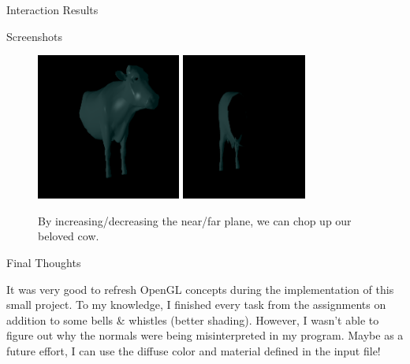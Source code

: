 \documentclass{article}
\begin{document}
\begin{section}{Interaction Results}
\begin{multicols}{2}
\begin{subsection}{Screenshots}
    \begin{figure}[H]
     \includegraphics[width=0.48\linewidth, height=13em]{./res/farclip.png}
     \includegraphics[width=0.48\linewidth, height=13em]{./res/nearclip.png}
     \caption{By increasing/decreasing the near/far plane, we can chop up our
beloved cow.}
    \end{figure}

  \end{subsection}

  \end{multicols}
  \end{section}
  \begin{multicols}{2}
  \begin{section}{Final Thoughts}

    It was very good to refresh OpenGL concepts during the implementation of
this small project. To my knowledge, I finished every task from the assignments
on addition to some bells \& whistles (better shading). However, I wasn't able to
figure out why the normals were being misinterpreted in my program. Maybe as a
future effort, I can use the diffuse color and material defined in the input
file!
    
  \end{section}
  \end{multicols}
\end{document}

